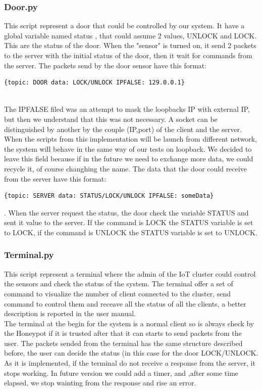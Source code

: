 \subsubsection{Door.py}
This script represent a door that could be controlled by our system. It have a global variable named status , that could assume 2 values, UNLOCK and LOCK.
This are the status of the door. When the "sensor" is turned on,  it send 2 packets to the server with the initial status of the door, then it wait for commands from the server.  The packets send by the door sensor have this format: \begin{verbatim}{topic: DOOR data: LOCK/UNLOCK IPFALSE: 129.0.0.1}\end{verbatim} \\ The IPFALSE filed was an attempt
to mask the loopbacks IP with external IP, but then we understand that this was not necessary. A socket can be distinguished by another by the couple (IP,port) 
of the client and the server. When the scripts from this implementation will be launch from different network, the system will behave in the same way of  our tests on loopback. We decided to leave this field because if in the future we need to exchange more data, we could recycle it, of course changhing the name.
The data that the door could receive from the server have this format: \begin{verbatim}{topic: SERVER data: STATUS/LOCK/UNLOCK IPFALSE: someData}\end{verbatim}. When the server 
request the status, the door check the variable STATUS and sent it value to the server.  If the command is LOCK the STATUS variable is set to LOCK, if the command is UNLOCK the STATUS variable is set to UNLOCK.


\subsubsection{Terminal.py}
This script represent a terminal where the admin of the IoT cluster could control the sensors and check the status of the system. The terminal offer a set of command to visualize the number of client connected to the cluster, send command to control them and receave all the status of all the clients, a better description is reported in the user manual.\\
The terminal at the begin for the system is a normal client so is always check by the Honeypot if it is trusted after that it can starts to send packets from the user.
The packets sended from the terminal has the same structure described before, the user can decide the status (in this case for the door LOCK/UNLOCK.\\%
As it is implemented, if the terminal do not receive a response from the server, it stops working.  In future version we could add a timer, and ,after some time elapsed, we stop wainting from the response and rise an error.




